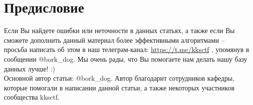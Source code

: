 \documentclass[12pt,a4paper]{scrartcl}
\begin{document}
	
\section{Предисловие}

Если Вы найдете ошибки или неточности в данных статьях, а также если Вы сможете
дополнить данный материал более эффективными алгоритмами – просьба написать об этом в наш
телеграм-канал: \href{https://t.me/kksctf}{https://t.me/kksctf} , упомянув в сообщении @bork\_dog. Мы очень рады, что Вы помогаете нам делать нашу базу данных лучше! :)\\

Основной автор статьи: @bork\_dog. Автор благодарит сотрудников кафедры, которые помогали в написании данной статьи, а также некоторых участников сообщества kksctf.	
	
\end{document}
